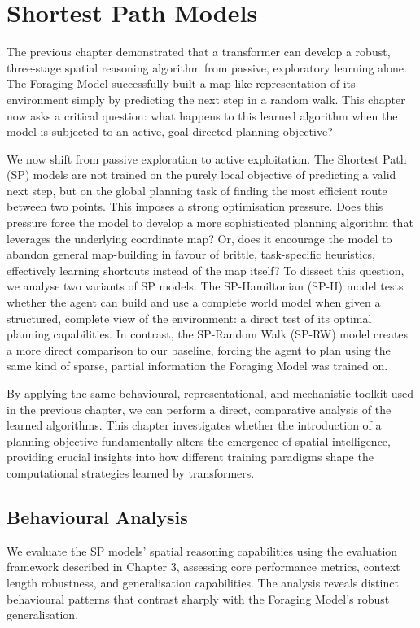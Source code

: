 \chapter{Shortest Path Models}

The previous chapter demonstrated that a transformer can develop a robust, three-stage spatial reasoning algorithm from passive, exploratory learning alone. The Foraging Model successfully built a map-like representation of its environment simply by predicting the next step in a random walk. This chapter now asks a critical question: what happens to this learned algorithm when the model is subjected to an active, goal-directed planning objective? 

We now shift from passive exploration to active exploitation. The Shortest Path (SP) models are not trained on the purely local objective of predicting a valid next step, but on the global planning task of finding the most efficient route between two points. This imposes a strong optimisation pressure. Does this pressure force the model to develop a more sophisticated planning algorithm that leverages the underlying coordinate map? Or, does it encourage the model to abandon general map-building in favour of brittle, task-specific heuristics, effectively learning shortcuts instead of the map itself? To dissect this question, we analyse two variants of SP models. The SP-Hamiltonian (SP-H) model tests whether the agent can build and use a complete world model when given a structured, complete view of the environment: a direct test of its optimal planning capabilities. In contrast, the SP-Random Walk (SP-RW) model creates a more direct comparison to our baseline, forcing the agent to plan using the same kind of sparse, partial information the Foraging Model was trained on.

By applying the same behavioural, representational, and mechanistic toolkit used in the previous chapter, we can perform a direct, comparative analysis of the learned algorithms. This chapter investigates whether the introduction of a planning objective fundamentally alters the emergence of spatial intelligence, providing crucial insights into how different training paradigms shape the computational strategies learned by transformers.


\section{Behavioural Analysis}

We evaluate the SP models' spatial reasoning capabilities using the evaluation framework described in Chapter 3, assessing core performance metrics, context length robustness, and generalisation capabilities. The analysis reveals distinct behavioural patterns that contrast sharply with the Foraging Model's robust generalisation.

